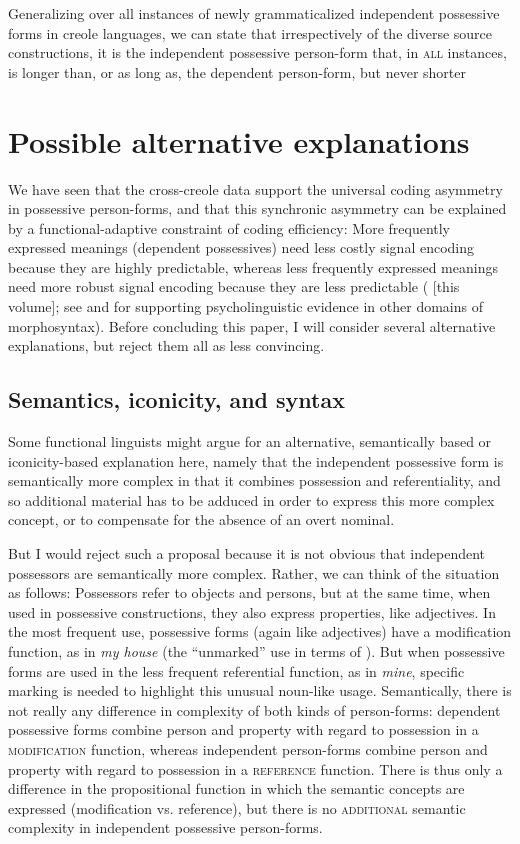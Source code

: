 \documentclass[output=paper]{langsci/langscibook}
\begin{document}
Generalizing over all instances of newly grammaticalized independent possessive forms in creole languages, we can state that irrespectively of the diverse source constructions, it is the independent possessive person-form that, in \textsc{all} instances, is longer than, or as long as, the dependent person-form, but never shorter


\section{Possible alternative explanations}

We have seen that the cross-creole data support the universal coding asymmetry in possessive person-forms, and that this synchronic asymmetry can be explained by a functional-adaptive constraint of coding efficiency: More frequently expressed meanings (dependent possessives) need less costly signal encoding because they are highly predictable, whereas less frequently expressed meanings need more robust signal encoding because they are less predictable (\citealt{Haspelmath2018} [this volume]; see \citealt{NorcliffeJaeger2016} and \citealt{JaegerBuz2018} for supporting psycholinguistic evidence in other domains of morphosyntax). Before concluding this paper, I will consider several alternative explanations, but reject them all as less convincing.


\subsection{ Semantics, iconicity, and syntax}

Some functional linguists might argue for an alternative, semantically based or iconicity-based explanation here, namely that the independent possessive form is semantically more complex in that it combines possession and referentiality, and so additional material has to be adduced in order to express this more complex concept, or to compensate for the absence of an overt nominal. 

But I would reject such a proposal because it is not obvious that independent possessors are semantically more complex. Rather, we can think of the situation as follows: Possessors refer to objects and persons, but at the same time, when used in possessive constructions, they also express properties, like adjectives. In the most frequent use, possessive forms (again like adjectives) have a modification function, as in \textit{my house} (the “unmarked” use in terms of \citealt{Croft1991}). But when possessive forms are used in the less frequent referential function, as in \textit{mine}, specific marking is needed to highlight this unusual noun-like usage. Semantically, there is not really any difference in complexity of both kinds of person-forms: dependent possessive forms combine person and property with regard to possession in a \textsc{modification} function, whereas independent person-forms combine person and property with regard to possession in a \textsc{reference} function. There is thus only a difference in the propositional function in which the semantic concepts are expressed (modification vs. reference), but there is no \textsc{additional} semantic complexity in independent possessive person-forms. 
\end{document}
